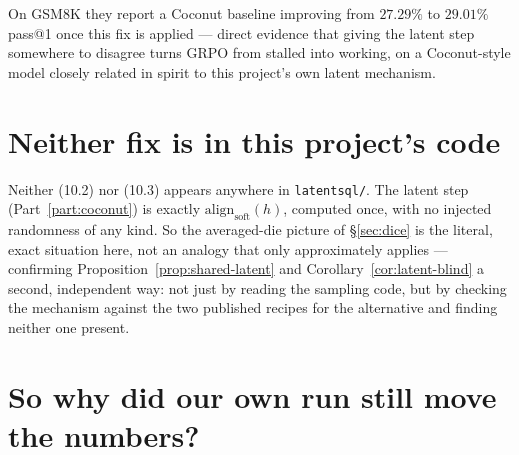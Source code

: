 \documentclass[11pt]{article}
\theoremstyle{definition}
\begin{document}
\begin{center}
\end{center}

On GSM8K they report a Coconut baseline improving from $27.29\%$ to $29.01\%$ pass@1 once this fix is applied --- direct evidence that giving the latent step somewhere to disagree turns GRPO from stalled into working, on a Coconut-style model closely related in spirit to this project's own latent mechanism.

\section{Neither fix is in this project's code}
\label{sec:neither-fix}

Neither (10.2) nor (10.3) appears anywhere in \texttt{latentsql/}. The latent step (Part~\ref{part:coconut}) is exactly $\mathrm{align}_{\mathrm{soft}}(h)$, computed once, with no injected randomness of any kind. So the averaged-die picture of \S\ref{sec:dice} is the literal, exact situation here, not an analogy that only approximately applies --- confirming Proposition~\ref{prop:shared-latent} and Corollary~\ref{cor:latent-blind} a second, independent way: not just by reading the sampling code, but by checking the mechanism against the two published recipes for the alternative and finding neither one present.

\begin{center}
\end{center}

\section{So why did our own run still move the numbers?}
\end{document}
